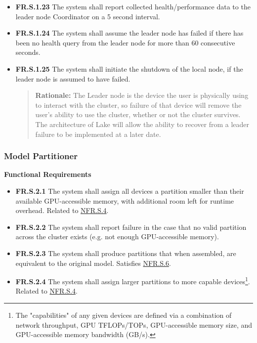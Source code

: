 \documentclass[12pt]{article}
\begin{document}
\begin{itemize}
\begin{itemize}
				led by the same device, so long as the local device was already participating in the original cluster.
			\item \label{FR.S.1.23}\textbf{FR.S.1.23} The system shall report collected health/performance data to the
				leader node Coordinator on a 5 second interval.
			\item \label{FR.S.1.24}\textbf{FR.S.1.24} The system shall assume the leader node has failed if there has been
				no health query from the leader node for more than 60 consecutive seconds.
			\item \label{FR.S.1.25}\textbf{FR.S.1.25} The system shall initiate the shutdown of the local node, if the leader
				node is assumed to have failed.
				\begin{quote}
					\textbf{Rationale:} The Leader node is the device the user is physically using to interact with the cluster,
					so failure of that device will remove the user's ability to use the cluster, whether or not the cluster survives.
					The architecture of Lake will allow the ability to recover from a leader failure to be implemented at a later date.
				\end{quote}
		\end{itemize}
\end{itemize}

\subsubsection{Model Partitioner}
\textbf{Functional Requirements}
\begin{itemize}
	\item \label{FR.S.2.1}\textbf{FR.S.2.1} The system shall assign all devices a partition smaller than their available
		GPU-accessible memory, with additional room left for runtime overhead. Related to \hyperref[NFR.S.4]{NFR.S.4}.
	\item \label{FR.S.2.2}\textbf{FR.S.2.2} The system shall report failure in the case that no valid partition across
		the cluster exists (e.g. not enough GPU-accessible memory).
	\item \label{FR.S.2.3}\textbf{FR.S.2.3} The system shall produce partitions that when assembled, are equivalent
		to the original model. Satisfies \hyperref[NFR.S.6]{NFR.S.6}.
	\item \label{FR.S.2.4}\textbf{FR.S.2.4} The system shall assign larger partitions to more capable
		devices\footnote{The "capabilities" of any given devices are defined via a combination of network throughput,
		GPU TFLOPs/TOPs, GPU-accessible memory size, and GPU-accessible memory bandwidth (GB/s).}.
		Related to \hyperref[NFR.S.4]{NFR.S.4}.
\end{itemize}
\end{document}
